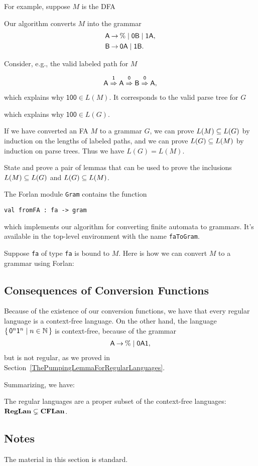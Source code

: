 For example, suppose $M$ is the DFA
\begin{center}
  
\end{center}
Our algorithm converts $M$ into the grammar
\begin{align*}
  \mathsf{A} &\mathbin{\to} \% \mid \mathsf{0B} \mid \mathsf{1A} , \\
  \mathsf{B} &\mathbin{\to} \mathsf{0A} \mid \mathsf{1B} .
\end{align*}

Consider, e.g., the valid labeled path for $M$
\begin{gather*}
\mathsf{A}\stackrel{\strut\mathsf{1}}{\Rightarrow}\mathsf{A}\stackrel{\strut\mathsf{0}}{\Rightarrow}\mathsf{B}\stackrel{\strut\mathsf{0}}{\Rightarrow}\mathsf{A} ,
\end{gather*}
which explains why $\mathsf{100}\in L(M)$.  It corresponds to the
valid parse tree for $G$
\begin{center}

\end{center}
which explains why $\mathsf{100}\in L(G)$.

If we have converted an FA $M$ to a grammar $G$, we can prove
$L(M)\subseteq L(G)$ by induction on the lengths of labeled paths,
and we can prove $L(G)\subseteq L(M)$ by induction on parse trees.
Thus we have $L(G) = L(M)$.

\begin{exercise}
State and prove a pair of lemmas that can be used to prove
the inclusions $L(M)\subseteq L(G)$ and $L(G)\subseteq L(M)$.
\end{exercise}

The Forlan module \texttt{Gram} contains the function
\begin{verbatim}
val fromFA : fa -> gram
\end{verbatim}
which implements our algorithm for converting finite automata to
grammars.  It's available in the top-level environment with the name
\texttt{faToGram}.

Suppose \texttt{fa} of type \texttt{fa} is bound to $M$.  Here is how
we can convert $M$ to a grammar using Forlan:


\subsection{Consequences of Conversion Functions}

Because of the existence of our conversion functions, we have that
every regular language is a context-free language.
On the other hand, the language $\{ \, \mathsf{0}^n\mathsf{1}^n \mid n\in\mathbb{N} \, \}$
is context-free, because of the grammar
\begin{gather*}
  \mathsf{A}\mathbin{\to}\%\mid\mathsf{0}\mathsf{A}\mathsf{1} ,
\end{gather*}
but is not regular, as we proved in
Section~\ref{ThePumpingLemmaForRegularLanguages}.

Summarizing, we have:

\begin{theorem}
The regular languages are a proper subset of the context-free
languages: $\mathbf{RegLan}\subsetneq\mathbf{CFLan}$.
\end{theorem}

\subsection{Notes}

The material in this section is standard.

